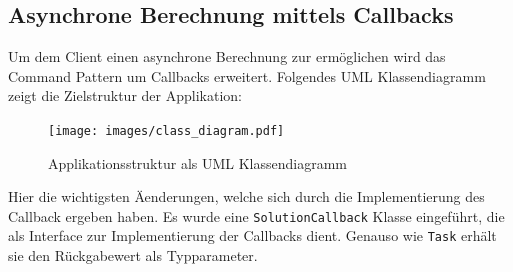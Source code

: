 \subsection{Asynchrone Berechnung mittels Callbacks}
Um dem Client einen asynchrone Berechnung zur erm\"oglichen wird das Command Pattern um Callbacks\cite{command-pattern-callback} erweitert.
Folgendes UML Klassendiagramm zeigt die Zielstruktur der Applikation:

\begin{figure}[H]
	\begin{center}
		\texttt{[image: images/class\_diagram.pdf]}
		\caption{Applikationsstruktur als UML Klassendiagramm}
		\label{broker}
	\end{center}
\end{figure}

Hier die wichtigsten \"Aenderungen, welche sich durch die Implementierung des Callback ergeben haben.
Es wurde eine \texttt{SolutionCallback} Klasse eingef\"uhrt, die als Interface zur Implementierung der Callbacks dient.
Genauso wie \texttt{Task} erh\"alt sie den R\"uckgabewert als Typparameter.

